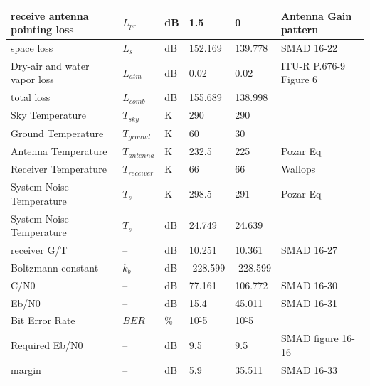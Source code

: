 \documentclass[12pt]{article}
\begin{document}
\begin{center}
\begin{longtable}{| p{3.9cm} | p{1.6cm} | p{1.4cm} | p{1.4cm} | p{1.4cm} | p{5cm} |}
    receive antenna pointing loss & $L_{pr}$ & dB    & 1.5   & 0     & Antenna Gain pattern \\\hline
    space loss & $L_s$  & dB    & 152.169 & 139.778 & SMAD 16-22 \\\hline
    Dry-air and water vapor loss & $L_{atm}$ & dB    & 0.02  & 0.02  & ITU-R P.676-9 Figure 6 \\\hline
    total loss & $L_{comb}$ & dB    & 155.689 & 138.998 &  \\\hline
    Sky Temperature & $T_{sky}$ & K     & 290   & 290   &  \\\hline
    Ground Temperature & $T_{ground}$ & K     & 60    & 30    &  \\\hline
    Antenna Temperature & $T_{antenna}$ & K     & 232.5 & 225   & Pozar Eq \\\hline
    Receiver Temperature & $T_{receiver}$ & K     & 66    & 66    & Wallops \\\hline
    System Noise Temperature & $T_s$  & K     & 298.5 & 291   & Pozar Eq \\\hline
    System Noise Temperature & $T_s$  & dB    & 24.749 & 24.639 &  \\\hline
    receiver G/T & --    & dB    & 10.251 & 10.361 & SMAD 16-27 \\\hline
    Boltzmann constant & $k_b$ & dB    & -228.599 & -228.599 &  \\\hline
    C/N0  & --    & dB    & 77.161 & 106.772 & SMAD 16-30 \\\hline
    Eb/N0 & --    & dB    & 15.4  & 45.011 & SMAD 16-31 \\\hline
    Bit Error Rate & $BER$   & \%    & 10\^-5 & 10\^-5 &  \\\hline
    Required Eb/N0 & --    & dB    & 9.5   & 9.5   & SMAD figure 16-16 \\\hline
    margin & --    & dB    & 5.9   & 35.511 & SMAD 16-33 \\
\hline
\end{longtable}
\end{center}


\noindent
\newline
\newpage
\end{document}

